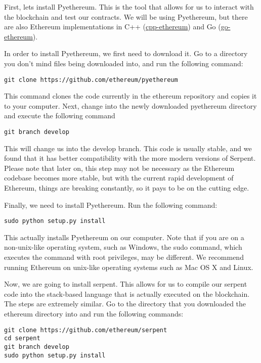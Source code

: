 \documentclass[12pt]{article}
\begin{document}
First, lets install Pyethereum. This is the tool that allows for us to interact with the blockchain and test our contracts. We will be using Pyethereum, but there are also Ethereum implementations in C++ (\href{https://github.com/ethereum/cpp-ethereum}{cpp-ethereum}) and Go (\href{https://github.com/ethereum/go-ethereum}{go-ethereum}).

In order to install Pyethereum, we first need to download it. Go to a directory you don't mind files being downloaded into, and run the following command:

\begin{lstlisting}
git clone https://github.com/ethereum/pyethereum
\end{lstlisting}

This command clones the code currently in the ethereum repository and copies it to your computer. Next, change into the newly downloaded pyethereum directory and execute the following command

\begin{lstlisting}
git branch develop
\end{lstlisting}

This will change us into the develop branch. This code is usually stable, and we found that it has better compatibility with the more modern versions of Serpent. Please note that later on, this step may not be necessary as the Ethereum codebase becomes more stable, but with the current rapid development of Ethereum, things are breaking constantly, so it pays to be on the cutting edge.

Finally, we need to install Pyethereum. Run the following command:

\begin{lstlisting}
sudo python setup.py install
\end{lstlisting}

This actually installs Pyethereum on our computer. Note that if you are on a non-unix-like operating system, such as Windows, the sudo command, which executes the command with root privileges, may be different. We recommend running Ethereum on unix-like operating systems such as Mac OS X and Linux.

Now, we are going to install serpent. This allows for us to compile our serpent code into the stack-based language that is actually executed on the blockchain. The steps are extremely similar. Go to the directory that you downloaded the ethereum directory into and run the following commands:

\begin{lstlisting}
git clone https://github.com/ethereum/serpent
cd serpent
git branch develop
sudo python setup.py install
\end{lstlisting}
\end{document}
